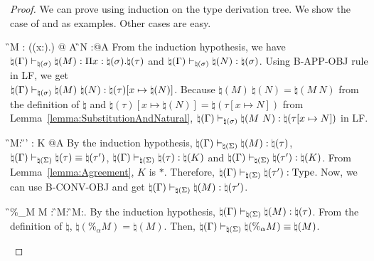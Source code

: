 \begin{proof}
    We can prove using induction on the type derivation tree.
    We show the case of \TApp{} and \TConv{} as examples.
    Other cases are easy.
    \begin{rneqncase}{\TApp{}}{
            \G \V M : (\Pi(x:\sigma).\tau) @ A  \G \V N :\sigma @A
        }
        From the induction hypothesis, we have \({ \natural(\Gamma)
        \vdash_{\natural(\sigma)} \natural(M) : \Pi
        x:\natural(\sigma).\natural(\tau) }\) and \({ \natural(\Gamma)
        \vdash_{\natural(\sigma)} \natural(N) : \natural(\sigma) }\).  Using
        \textsc{B-APP-OBJ} rule in LF, we get \\ \({ \natural(\Gamma)
        \vdash_{\natural(\sigma)} \natural(M)\ \natural(N) : \natural(\tau)[x
        \mapsto \natural(N)] }\).  Because \({ \natural(M)\ \natural(N) =
        \natural(M\ N) }\) from the definition of $\natural$ and \({ \natural(\tau)[x \mapsto \natural(N)] = \natural(\tau[x \mapsto N]) }\) from Lemma~\ref{lemma:SubstitutionAndNatural},
        ${ \natural(\Gamma) \vdash_{\natural(\sigma)} \natural(M\ N) :
        \natural(\tau[x \mapsto N]) }$ in LF.
    \end{rneqncase}
    \begin{rneqncase}{\TConv{}}{
            \G\V M:\tau@A {} \G\V \tau \E \tau' : K @A
        }
        By the induction hypothesis, \( \natural(\Gamma) \vdash_{\natural(\Sigma)}
        \natural(M):\natural(\tau) \), \( \natural(\Gamma)
        \vdash_{\natural(\Sigma)} \natural(\tau) \equiv \natural(\tau') \), \(
        \natural(\Gamma) \vdash_{\natural(\Sigma)} \natural(\tau) : \natural(K) \)
        and \( \natural(\Gamma) \vdash_{\natural(\Sigma)} \natural(\tau') :
        \natural(K) \). From Lemma~\ref{lemma:Agreement}, \( K \) is \( * \).
        Therefore, \( \natural(\Gamma) \vdash_{\natural(\Sigma)} \natural(\tau') :
        \text{Type} \). Now, we can use \textsc{B-CONV-OBJ} and get \(
        \natural(\Gamma) \vdash_{\natural(\Sigma)} \natural(M) : \natural(\tau')
        \).
    \end{rneqncase}
    \begin{rneqncase}{\QPercent}{
            \G\V\%_\alpha M \E M :  
            \G\V M: 
            \G\V M:\tau@A.
        }
        By the induction hypothesis, \( \natural(\Gamma) \vdash_{\natural(\Sigma)}
        \natural(M):\natural(\tau) \).  From the definition of \( \natural \),
        \( \natural(\%_\alpha M) = \natural(M) \). Then, \( \natural(\Gamma)
        \vdash_{\natural(\Sigma)} \natural(\%_\alpha M) \equiv \natural(M) \).
    \end{rneqncase}
\end{proof}

